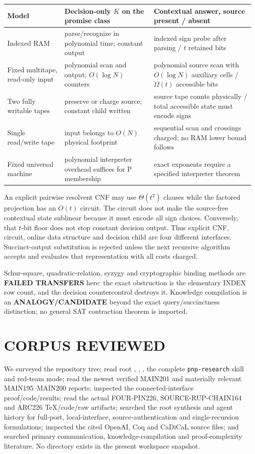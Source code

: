 \documentclass[11pt]{article}
\begin{document}
\begin{center}
\begin{tabular}{p{.19\linewidth}p{.34\linewidth}p{.37\linewidth}}
\toprule
Model & Decision-only $K$ on the promise class & Contextual answer, source present / absent \\
\midrule
Indexed RAM & parse/recognize in polynomial time; constant output & indexed sign probe after parsing / $t$ retained bits \\
Fixed multitape, read-only input & polynomial scan and output; $O(\log N)$ counters & polynomial source scan with $O(\log N)$ auxiliary cells / $\Omega(t)$ accessible bits \\
Two fully writable tapes & preserve or charge source; constant child written & source tape counts physically / total accessible state must encode signs \\
Single read/write tape & input belongs to $O(N)$ physical footprint & sequential scan and crossings charged; no RAM lower bound follows \\
Fixed universal machine & polynomial interpreter overhead suffices for P membership & exact exponents require a specified interpreter theorem \\
\bottomrule
\end{tabular}
\end{center}

An explicit pairwise resolvent CNF may use $\Theta(t^2)$ clauses while the
factored projection has an $O(t)$ circuit.  The circuit does not make the
source-free contextual state sublinear because it must encode all sign choices.
Conversely, that $t$-bit floor does not stop constant decision output.  Thus
explicit CNF, circuit, online data structure and decision child are four
different interfaces.  Succinct-output substitution is rejected unless the
next recursive algorithm accepts and evaluates that representation with all
costs charged.

Schur-square, quadratic-relation, syzygy and cryptographic binding methods are
\textbf{FAILED TRANSFERS} here: the exact obstruction is the elementary INDEX
row count, and the decision countercontrol destroys it.  Knowledge compilation
is an \textbf{ANALOGY/CANDIDATE} beyond the exact query/succinctness distinction;
no general SAT contraction theorem is imported.

\section{CORPUS REVIEWED}
We surveyed the repository tree; read root , ,
, the complete \texttt{pnp-research} skill and red-team mode;
read the newest verified MAIN201 and materially relevant MAIN195--MAIN200
reports; inspected the connected-interface proof/code/results; read the actual
FOUR-PIN226, SOURCE-RUP-CHAIN164 and ARC226 TeX/code/raw artifacts; searched
the root synthesis and agent history for full-port, local-interface,
source-authentication and single-recursion formulations; inspected the cited
OpenAI, Coq and CaDiCaL source files; and searched primary communication,
knowledge-compilation and proof-complexity literature.  No 
directory exists in the present workspace snapshot.
\end{document}
